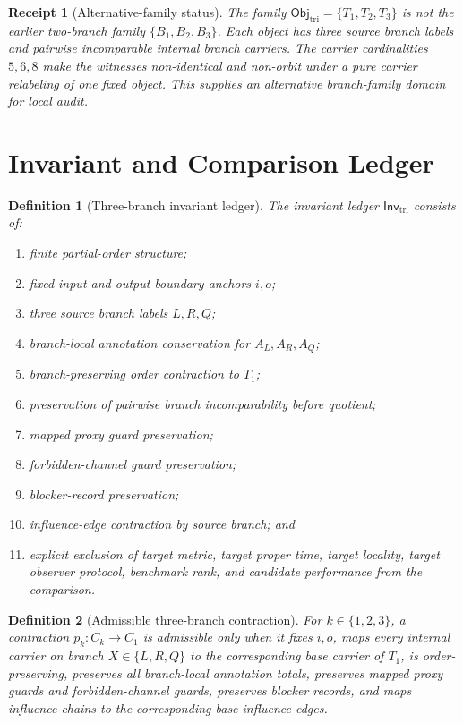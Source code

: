 \documentclass[11pt]{article}
\newcommand{\ObjTri}{\mathsf{Obj}_{\mathrm{tri}}}
\newcommand{\InvTri}{\mathsf{Inv}_{\mathrm{tri}}}
\newtheorem{definitionblock}{Definition}
\newtheorem{receipt}{Receipt}
\begin{document}
\begin{receipt}[Alternative-family status]
The family \(\ObjTri=\{T_{1},T_{2},T_{3}\}\) is not the earlier
two-branch family \(\{B_{1},B_{2},B_{3}\}\). Each object has three
source branch labels and pairwise incomparable internal branch carriers.
The carrier cardinalities \(5,6,8\) make the witnesses non-identical and
non-orbit under a pure carrier relabeling of one fixed object. This
supplies an alternative branch-family domain for local audit.
\end{receipt}

\section{Invariant and Comparison Ledger}

\begin{definitionblock}[Three-branch invariant ledger]
The invariant ledger \(\InvTri\) consists of:
\begin{enumerate}
    \item finite partial-order structure;
    \item fixed input and output boundary anchors \(i,o\);
    \item three source branch labels \(L,R,Q\);
    \item branch-local annotation conservation for \(A_{L},A_{R},A_{Q}\);
    \item branch-preserving order contraction to \(T_{1}\);
    \item preservation of pairwise branch incomparability before quotient;
    \item mapped proxy guard preservation;
    \item forbidden-channel guard preservation;
    \item blocker-record preservation;
    \item influence-edge contraction by source branch; and
    \item explicit exclusion of target metric, target proper time, target
    locality, target observer protocol, benchmark rank, and candidate
    performance from the comparison.
\end{enumerate}
\end{definitionblock}

\begin{definitionblock}[Admissible three-branch contraction]
For \(k\in\{1,2,3\}\), a contraction \(p_{k}:C_{k}\to C_{1}\) is
admissible only when it fixes \(i,o\), maps every internal carrier on
branch \(X\in\{L,R,Q\}\) to the corresponding base carrier of \(T_{1}\),
is order-preserving, preserves all branch-local annotation totals,
preserves mapped proxy guards and forbidden-channel guards, preserves
blocker records, and maps influence chains to the corresponding base
influence edges.
\end{definitionblock}
\end{document}
